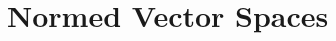 \documentclass[../../../deep-dive]{subfiles}
\begin{document}
\chapter{Normed Vector Spaces}


\end{document}
